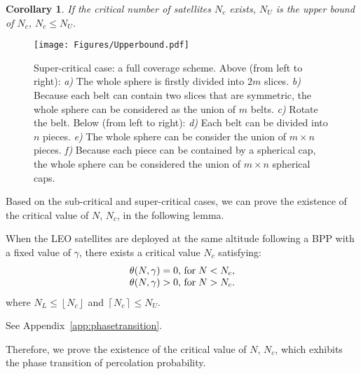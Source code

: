 \documentclass[final]{IEEEtran}
\newtheorem{corollary}{Corollary}
\begin{document}
\begin{corollary}
    If the critical number of satellites $N_c$ exists, $N_U$ is the upper bound of $N_c$, \ie $N_c\leq N_U$.
    \label{cor:supercritical}
\end{corollary}
\begin{figure}
    \centering
    \texttt{[image: Figures/Upperbound.pdf]}
    \caption{Super-critical case: a full coverage scheme. Above (from left to right): \textit{a)} The whole sphere is firstly divided into $2m$ slices. \textit{b)} Because each belt can contain two slices that are symmetric, the whole sphere can be considered as the union of $m$ belts. \textit{c)} Rotate the belt. Below (from left to right): \textit{d)} Each belt can be divided into $n$ pieces. \textit{e)} The whole sphere can be consider the union of $m\times n$ pieces. \textit{f)} Because each piece can be contained by a spherical cap, the whole sphere can be considered the union of $m\times n$ spherical caps.}
    \label{fig:Upperbound}
\end{figure}

 Based on the sub-critical and super-critical cases, we can prove the existence of the critical value of $N$, \ie $N_c$, in the following lemma.

\begin{lemma}\label{lem:phasetransition}
    When the LEO satellites are deployed at the same altitude following a BPP with a fixed value of $\gamma$, there exists a critical value $N_c$ satisfying:
    \begin{equation}
    \begin{array}{c}
        \theta(N,\gamma)=0,\, {\rm for}\; N<  N_c,\\
        \theta(N,\gamma)>0,\, {\rm for}\; N> N_c. 
    \end{array}
    \end{equation}
where $N_L\leq \left\lfloor N_c\right\rfloor$ and $\left\lceil N_c\right\rceil\leq N_U$.
\end{lemma}
\begin{IEEEproof}
    See Appendix~\ref{app:phasetransition}.
\end{IEEEproof}
Therefore, we prove the existence of the critical value of $N$, \ie $N_c$, which exhibits the phase transition of percolation probability.
\end{document}
